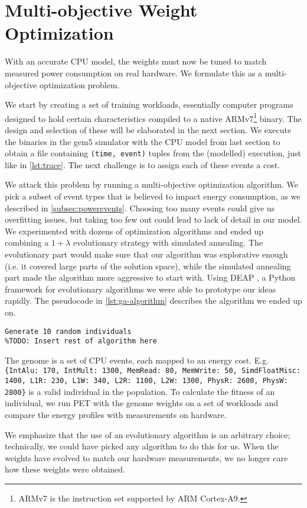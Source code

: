 \section{Multi-objective Weight Optimization}

With an accurate CPU model, the weights must now be tuned to match measured
power consumption on real hardware. We formulate this as a multi-objective
optimization problem.

We start by creating a set of training workloads, essentially computer programs
designed to hold certain characteristics compiled to a native
ARMv7\footnote{ARMv7 is the instruction set supported by ARM Cortex-A9.} binary.
The design and selection of these will be elaborated in the next section. We
execute the binaries in the gem5 simulator with the CPU model from last
section to obtain a file containing \texttt{(time, event)} tuples from the
(modelled) execution, just like in \autoref{lst:trace}. The next challenge is to
assign each of these events a cost.

We attack this problem by running a multi-objective optimization algorithm. We
pick a subset of event types that is believed to impact energy consumption, as
we described in \autoref{subsec:powerevents}. Choosing too many events could
give us overfitting issues, but taking too few out could lead to lack of detail
in our model. We experimented with dozens of optimization algorithms and ended
up combining a $1 + \lambda$ evolutionary strategy with simulated annealing. The
evolutionary part would make sure that our algorithm was explorative enough
(i.e. it covered large parts of the solution space), while the simulated
annealing part made the algorithm more aggressive to start with.  Using DEAP
\cite{DEAP_JMLR2012}, a Python framework for evolutionary algorithms we were
able to prototype our ideas rapidly. The pseudocode in
\autoref{lst:ga-algorithm} describes the algorithm we ended up on.

\begin{lstlisting}[caption={Algorithm used to evolve a set of event weights},label={lst:ga-algorithm}]
Generate 10 random individuals
%TODO: Insert rest of algorithm here
\end{lstlisting}

\begin{figure}
    \centering
    \def\svgwidth{\columnwidth}
    
\end{figure}

The genome is a set of CPU events, each mapped to an energy cost. E.g.
\texttt{\{IntAlu: 170, IntMult: 1300, MemRead: 80, MemWrite: 50, SimdFloatMisc:
1400, L1R: 230, L1W: 340, L2R: 1100, L2W: 1300, PhysR: 2600, PhysW: 2800\}} is a
valid individual in the population. To calculate the fitness of an individual,
we run PET with the genome weights on a set of workloads and compare the energy
profiles with measurements on hardware.

We emphasize that the use of an evolutionary algorithm is an arbitrary choice;
technically, we could have picked any algorithm to do this for us. When the
weights have evolved to match our hardware measurements, we no longer care how
these weights were obtained.
